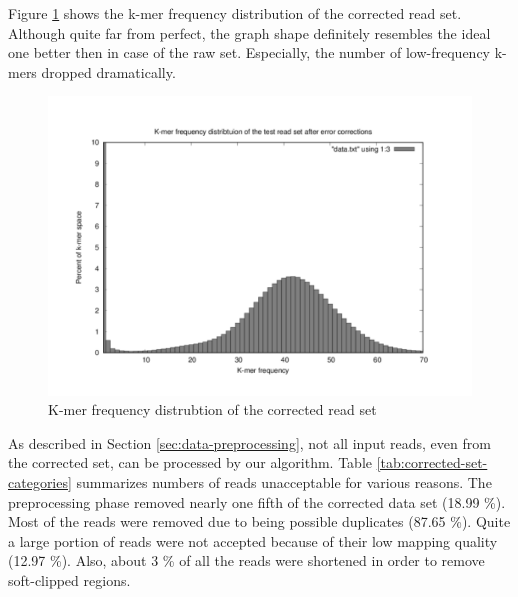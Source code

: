 Figure \ref{fig:test-kmer-frequency-distribution2} shows the k-mer frequency distribution of the corrected read set. Although quite far from perfect, the graph shape definitely resembles the ideal one better then in case of the raw set. Especially, the number of low-frequency k-mers dropped dramatically.

\begin{figure}[h]
\centering
\includegraphics{img/test-kmer-frequency-distribution2.pdf}
\caption{K-mer frequency distrubtion of the corrected read set}
\label{fig:test-kmer-frequency-distribution2}
\end{figure}

As described in Section \ref{sec:data-preprocessing}, not all input reads, even from the corrected set, can be processed by our algorithm. Table \ref{tab:corrected-set-categories} summarizes numbers of reads unacceptable for various reasons. The preprocessing phase removed nearly one fifth of the corrected data set (18.99 \%). Most of the reads were removed due to being possible duplicates (87.65 \%). Quite a large portion of  reads were not accepted because of their low mapping quality (12.97 \%). Also, about 3 \% of all the reads were shortened in order to remove soft-clipped regions.

